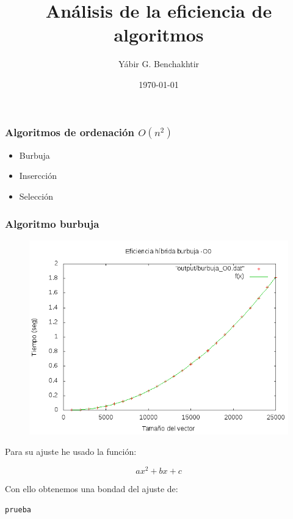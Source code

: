 \documentclass[spanish]{beamer}
\title{Análisis de la eficiencia de algoritmos}
\date{\today}
\author{Yábir G. Benchakhtir}
\institute{Doble Grado en Ingeniería Informática y Matemáticas}
\begin{document}
\frame{\titlepage}

\begin{frame}\frametitle{Algoritmos de ordenación $O(n^2)$}

  \begin{itemize}
  \item Burbuja
  \item Insercción
  \item Selección
  \end{itemize}
\end{frame}

%
%

\begin{frame}\frametitle{Algoritmo burbuja}
  \begin{figure}[H]
    \centering   
        \includegraphics[clip,width=1\columnwidth]{../../plots/burbuja_O0_fit.png}%
    \end{figure}
  \end{frame}

\begin{frame}[fragile]
  Para su ajuste he usado la función:

  $$ax^2+bx+c$$

  Con ello obtenemos una bondad del ajuste de:
  
\begin{verbatim}
prueba
\end{verbatim}
  
\end{frame}


%
%
\end{document}
